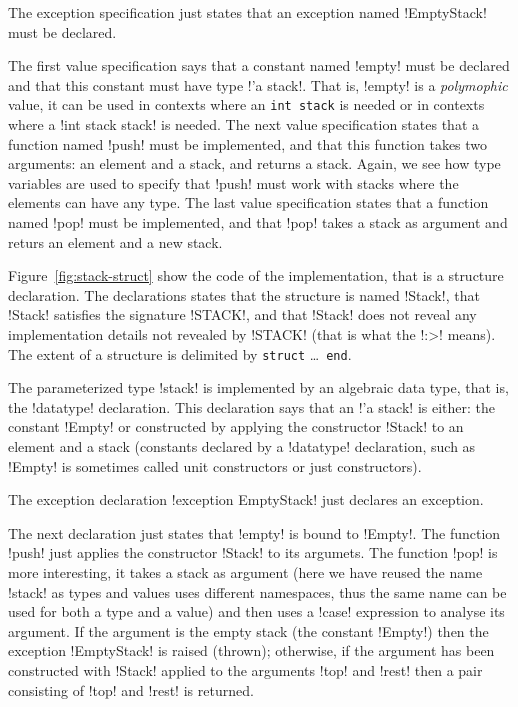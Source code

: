 \documentclass[workingdraft]{usetex-v1}
\begin{document}
The exception specification just states that an exception named
!EmptyStack! must be declared.

The first value specification says that a constant named !empty! must
be declared and that this constant must have type !'a stack!.  That
is, !empty! is a \emph{polymophic} value, it can be used in contexts
where an \texttt{int stack} is needed or in contexts where a
!int stack stack! is needed.  The next value specification states that a
function named !push! must be implemented, and that this function
takes two arguments: an element and a stack, and returns a stack.
Again, we see how type variables are used to specify that !push! must
work with stacks where the elements can have any type.  The last value
specification states that a function named !pop! must be implemented,
and that !pop!  takes a stack as argument and returs an element and a
new stack.

Figure~\ref{fig:stack-struct} show the code of the implementation, that is a
structure declaration.  The declarations states
that the structure is named !Stack!, that !Stack! satisfies the
signature !STACK!, and that !Stack! does not reveal any implementation
details not revealed by !STACK! (that is what the !:>! means).  The
extent of a structure is delimited by \texttt{struct} \ldots\ 
\texttt{end}.

The parameterized type !stack! is implemented by an algebraic data
type, that is, the !datatype! declaration.  This declaration says that
an !'a stack! is either: the constant !Empty! or constructed by
applying the constructor !Stack! to an element and a stack (constants
declared by a !datatype! declaration, such as !Empty!  is sometimes
called unit constructors or just constructors).

The exception declaration !exception EmptyStack! just declares an
exception.

The next declaration just states that !empty! is bound to !Empty!.  The
function !push! just applies the constructor !Stack! to its argumets.
The function !pop! is more interesting, it takes a stack as argument
(here we have reused the name !stack! as types and values uses
different namespaces, thus the same name can be used for both a type
and a value) and then uses a !case! expression to analyse its argument.
If the argument is the empty stack (the constant !Empty!) then the
exception !EmptyStack! is raised (thrown); otherwise, if the argument
has been constructed with !Stack! applied to the arguments !top! and
!rest! then a pair consisting of !top! and !rest! is returned.
\end{document}
